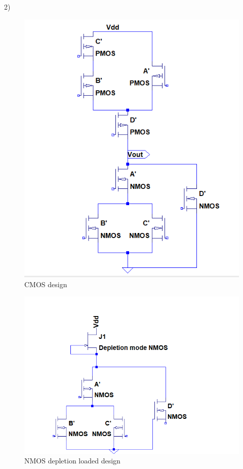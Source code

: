 \documentclass[11 pt]{article}
\begin{document}
2)
\begin{figure}[H]
\centering
  \includegraphics[scale=0.7]{cmos}
  \caption{CMOS design}
  \label{fig:zero}
\end{figure}
\begin{figure}[H]
\centering
  \includegraphics[scale=0.7]{depletion}
  \caption{NMOS depletion loaded design}
  \label{fig:zero}
\end{figure}
\end{document}
